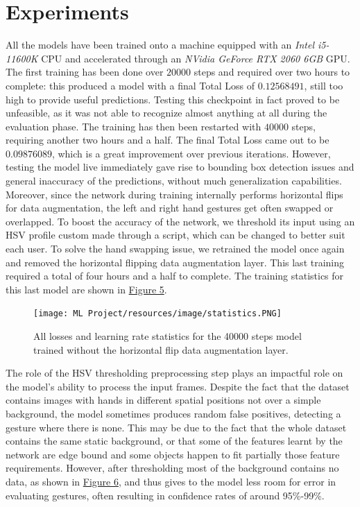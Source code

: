 \documentclass[a4paper, 12pt]{article}
\begin{document}
\section{Experiments}
\begin{flushleft}
All the models have been trained onto a machine equipped with an \textit{Intel i5-11600K} CPU and accelerated through an \textit{NVidia GeForce RTX 2060 6GB} GPU.
The first training has been done over $20000$ steps and required over two hours to complete: this produced a model with a final Total Loss of $0.12568491$, still too high to provide useful predictions. Testing this checkpoint in fact proved to be unfeasible, as it was not able to recognize almost anything at all during the evaluation phase.
The training has then been restarted with $40000$ steps, requiring another two hours and a half. The final Total Loss came out to be $0.09876089$, which is a great improvement over previous iterations. However, testing the model live immediately gave rise to bounding box detection issues and general inaccuracy of the predictions, without much generalization capabilities. Moreover, since the network during training internally performs horizontal flips for data augmentation, the left and right hand gestures get often swapped or overlapped. To boost the accuracy of the network, we threshold its input using an HSV profile custom made through a script, which can be changed to better suit each user.
To solve the hand swapping issue, we retrained the model once again and removed the horizontal flipping data augmentation layer. This last training required a total of four hours and a half to complete. 
The training statistics for this last model are shown in \hyperref[figure5]{Figure 5}.
\begin{figure}[!h]
    \centering
    \texttt{[image: ML Project/resources/image/statistics.PNG]} \caption{All losses and learning rate statistics for the 40000 steps model trained without the horizontal flip data augmentation layer.}
\end{figure}
\label{figure5}
The role of the HSV thresholding preprocessing step plays an impactful role on the model's ability to process the input frames. Despite the fact that the dataset contains images with hands in different spatial positions not over a simple background, the model sometimes produces random false positives, detecting a gesture where there is none. This may be due to the fact that the whole dataset contains the same static background, or that some of the features learnt by the network are edge bound and some objects happen to fit partially those feature requirements. However, after thresholding most of the background contains no data, as shown in \hyperref[figure6]{Figure 6}, and thus gives to the model less room for error in evaluating gestures, often resulting in confidence rates of around 95\%-99\%.


\end{flushleft}
\end{document}
